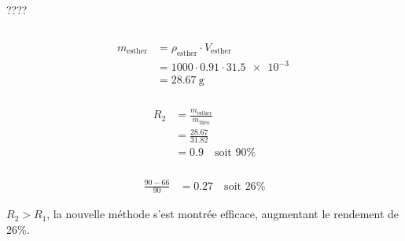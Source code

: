 \documentclass{article}
\begin{document}
\subsubsection{}
????

\subsection{}
\subsubsection{}

\[\begin{split}
	m_\text{esther} &= \rho_\text{esther} \cdot V_\text{esther} \\
			&= 1000 \cdot 0.91 \cdot \SI{31.5e-3}{} \\
			&= \SI{28.67}{\gram}
\end{split}\]

\subsubsection{}

\[\begin{split}
	R_2 &= \frac{m_\text{esther}}{m_\text{théo}} \\
	    &= \frac{28.67}{31.82} \\
	    &= 0.9 \quad\text{soit } 90\%
\end{split}\]

\subsubsection{}

\[\begin{split}
	\frac{90-66}{90} &= 0.27\quad\text{soit }26\%
\end{split}\]

$R_2 > R_1$, la nouvelle méthode s'est montrée efficace, augmentant le rendement de 26\%.
\end{document}
